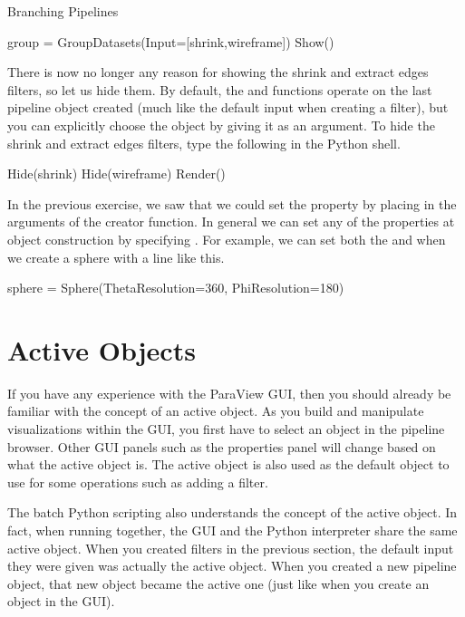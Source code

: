 \begin{exercise}{Branching Pipelines}
  \begin{python}
group = GroupDatasets(Input=[shrink,wireframe])
Show()
  \end{python}

  There is now no longer any reason for showing the shrink and extract
  edges filters, so let us hide them.  By default, the  and
   functions operate on the last pipeline object created (much
  like the default input when creating a filter), but you can explicitly
  choose the object by giving it as an argument.  To hide the shrink and
  extract edges filters, type the following in the Python shell.

  \begin{python}
Hide(shrink)
Hide(wireframe)
Render()
  \end{python}
\end{exercise}

In the previous exercise, we saw that we could set the 
property by placing  in the arguments
of the creator function.  In general we can set any of the properties at
object construction by specifying .  For example, we can set both the
 and  when we create a sphere
with a line like this.

\begin{python}
sphere = Sphere(ThetaResolution=360, PhiResolution=180)
\end{python}


\section{Active Objects}
\label{sec:ActiveObjects}

If you have any experience with the ParaView GUI, then you should already
be familiar with the concept of an active object.  As you build and
manipulate visualizations within the GUI, you first have to select an
object in the pipeline browser.  Other GUI panels such as the properties
panel will change based on what the active object is.  The active
object is also used as the default object to use for some operations such
as adding a filter.

The batch Python scripting also understands the concept of the active
object.  In fact, when running together, the GUI and the Python interpreter
share the same active object.  When you created filters in the previous
section, the default input they were given was actually the active object.
When you created a new pipeline object, that new object became the active
one (just like when you create an object in the GUI).

